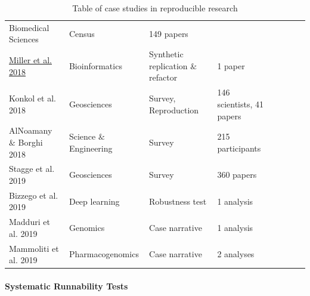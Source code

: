\documentclass{drexelthesis}
\begin{document}
\begin{table}[H]
\begin{adjustbox}{max width=\textwidth}
\begin{tabular}{p{3.86cm}p{4.12cm}p{4.29cm}p{4.24cm}p{3.86cm}p{4.12cm}p{4.29cm}p{4.24cm}}
\multicolumn{1}{p{4.12cm}}{Biomedical Sciences} & 
\multicolumn{1}{p{4.29cm}}{Census} & 
\multicolumn{1}{p{4.24cm}}{149 papers} \\ 
\multicolumn{1}{p{3.86cm}}{\href{https://drive.google.com/drive/folders/1thtenK7azxzys__RBH4ql3Y-x2J4OW-x}{\uline{Miller et al. 2018}} } & 
\multicolumn{1}{p{4.12cm}}{Bioinformatics} & 
\multicolumn{1}{p{4.29cm}}{Synthetic replication $\&$ refactor} & 
\multicolumn{1}{p{4.24cm}}{1 paper} \\ 
\multicolumn{1}{p{3.86cm}}{Konkol et al. 2018 \cite{Konkol2019-ld}} & 
\multicolumn{1}{p{4.12cm}}{Geosciences} & 
\multicolumn{1}{p{4.29cm}}{Survey, Reproduction} & 
\multicolumn{1}{p{4.24cm}}{146 scientists, 41 papers} \\ 
\multicolumn{1}{p{3.86cm}}{AlNoamany $\&$ Borghi 2018 \cite{AlNoamany2018-vh}} & 
\multicolumn{1}{p{4.12cm}}{Science $\&$ Engineering} & 
\multicolumn{1}{p{4.29cm}}{Survey} & 
\multicolumn{1}{p{4.24cm}}{215 participants} \\ 
\multicolumn{1}{p{3.86cm}}{Stagge et al. 2019 \cite{Stagge2019-fv}} & 
\multicolumn{1}{p{4.12cm}}{Geosciences} & 
\multicolumn{1}{p{4.29cm}}{Survey} & 
\multicolumn{1}{p{4.24cm}}{360 papers} \\ 
\multicolumn{1}{p{3.86cm}}{Bizzego et al. 2019 \cite{Bizzego2019-ij}} & 
\multicolumn{1}{p{4.12cm}}{Deep learning} & 
\multicolumn{1}{p{4.29cm}}{Robustness test} & 
\multicolumn{1}{p{4.24cm}}{1 analysis} \\ 
\multicolumn{1}{p{3.86cm}}{Madduri et al. 2019 \cite{Madduri2018-kc}} & 
\multicolumn{1}{p{4.12cm}}{Genomics} & 
\multicolumn{1}{p{4.29cm}}{Case narrative} & 
\multicolumn{1}{p{4.24cm}}{1 analysis} \\ 
\multicolumn{1}{p{3.86cm}}{Mammoliti et al. 2019 \cite{Mammoliti2019-ht}} & 
\multicolumn{1}{p{4.12cm}}{Pharmacogenomics} & 
\multicolumn{1}{p{4.29cm}}{Case narrative} & 
\multicolumn{1}{p{4.24cm}}{2 analyses} \\ 
\end{tabular}
\end{adjustbox}
\caption{Table of case studies in reproducible research}
\end{table}

\paragraph{Systematic Runnability Tests}
\end{document}

